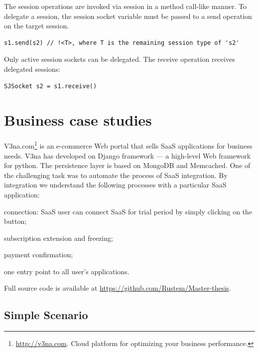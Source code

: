 \documentclass{llncs}
\begin{document}
The session operations are invoked via session in a method call-like manner. To delegate a session, the session socket variable must be passed to a send operation on the target session.

\begin{lstlisting}
s1.send(s2) // !<T>, where T is the remaining session type of 's2'
\end{lstlisting}


Only active session sockets can be delegated. The receive operation receives delegated sessions:

\begin{lstlisting}
SJSocket s2 = s1.receive()
\end{lstlisting}

\section{Business case studies}
\label{sect:impl}

V3na.com\footnote{\url{http://v3na.com}. Cloud platform for optimizing your business performance.}
is an e-commerce Web portal that sells SaaS applications for business needs. V3na has developed on Django framework --- a high-level Web framework for python. %
The persistence layer is based on MongoDB and Memcached. One of the challenging task was to automate the process of SaaS integration. By integration we understand the following processes with a particular SaaS application:

\begin{compactitem}
\item  connection: SaaS user can connect SaaS for trial period by simply clicking on the button;

\item  subscription extension and freezing;

\item  payment confirmation;

\item one entry point to all user's applications.
\end{compactitem}
Full source  code is available at \url{https://github.com/Rustem/Master-thesis}.

\subsection{Simple Scenario}
\end{document}
